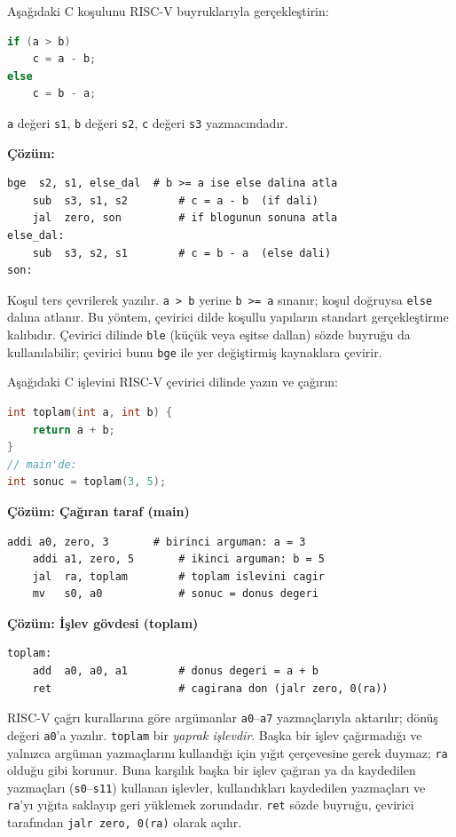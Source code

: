 \begin{ornek}[C.3]
\label{orn:ekc-kosul}
Aşağıdaki C koşulunu RISC-V buyruklarıyla gerçekleştirin:
\begin{lstlisting}[language=C]
if (a > b)
    c = a - b;
else
    c = b - a;
\end{lstlisting}
\texttt{a} değeri \texttt{s1}, \texttt{b} değeri \texttt{s2}, \texttt{c} değeri \texttt{s3} yazmacındadır.

\textbf{Çözüm:}
\begin{lstlisting}[style=riscv]
    bge  s2, s1, else_dal  # b >= a ise else dalina atla
    sub  s3, s1, s2        # c = a - b  (if dali)
    jal  zero, son         # if blogunun sonuna atla
else_dal:
    sub  s3, s2, s1        # c = b - a  (else dali)
son:
\end{lstlisting}

Koşul ters çevrilerek yazılır. \texttt{a > b} yerine \texttt{b >= a} sınanır; koşul doğruysa \texttt{else} dalına atlanır. Bu yöntem, çevirici dilde koşullu yapıların standart gerçekleştirme kalıbıdır. Çevirici dilinde \texttt{ble} (küçük veya eşitse dallan) sözde buyruğu da kullanılabilir; çevirici bunu \texttt{bge} ile yer değiştirmiş kaynaklara çevirir.
\end{ornek}

\begin{ornek}[C.4]
\label{orn:ekc-altyordam}
Aşağıdaki C işlevini RISC-V çevirici dilinde yazın ve çağırın:
\begin{lstlisting}[language=C]
int toplam(int a, int b) {
    return a + b;
}
// main'de:
int sonuc = toplam(3, 5);
\end{lstlisting}

\textbf{Çözüm: Çağıran taraf (main)}
\begin{lstlisting}[style=riscv]
    addi a0, zero, 3       # birinci arguman: a = 3
    addi a1, zero, 5       # ikinci arguman: b = 5
    jal  ra, toplam        # toplam islevini cagir
    mv   s0, a0            # sonuc = donus degeri
\end{lstlisting}

\textbf{Çözüm: İşlev gövdesi (toplam)}
\begin{lstlisting}[style=riscv]
toplam:
    add  a0, a0, a1        # donus degeri = a + b
    ret                    # cagirana don (jalr zero, 0(ra))
\end{lstlisting}

RISC-V çağrı kurallarına göre argümanlar \texttt{a0}--\texttt{a7} yazmaçlarıyla aktarılır; dönüş değeri \texttt{a0}'a yazılır. \texttt{toplam} bir \emph{yaprak işlevdir}. Başka bir işlev çağırmadığı ve yalnızca argüman yazmaçlarını kullandığı için yığıt çerçevesine gerek duymaz; \texttt{ra} olduğu gibi korunur. Buna karşılık başka bir işlev çağıran ya da kaydedilen yazmaçları (\texttt{s0}--\texttt{s11}) kullanan işlevler, kullandıkları kaydedilen yazmaçları ve \texttt{ra}'yı yığıta saklayıp geri yüklemek zorundadır. \texttt{ret} sözde buyruğu, çevirici tarafından \texttt{jalr zero, 0(ra)} olarak açılır.
\end{ornek}

